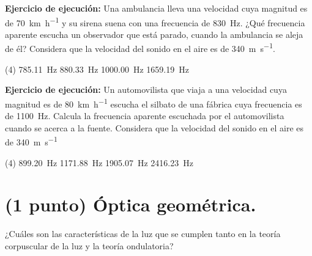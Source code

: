 \documentclass[12pt, letter]{exam}
\begin{document}
\begin{questions}
   \question \label{Ejercicio_04} \textbf{Ejercicio de ejecución: } Una ambulancia lleva una velocidad cuya magnitud es de \SI{70}{\kilo\meter\per\hour} y su sirena suena con una frecuencia de \SI{830}{\hertz}. ¿Qué frecuencia aparente escucha un observador que está parado, cuando la ambulancia se aleja de él? Considera que la velocidad del sonido en el aire es de \SI{340}{\meter\per\second}.
   \begin{tasks}(4)
    \task \SI{785.11}{\hertz}
    \task \SI{880.33}{\hertz}
    \task \SI{1000.00}{\hertz}
    \task \SI{1659.19}{\hertz}
    \end{tasks}
    \question \label{Ejercicio_05} \textbf{Ejercicio de ejecución: } Un automovilista que viaja a una velocidad cuya magnitud es de \SI{80}{\kilo\meter\per\hour} escucha el silbato de una fábrica cuya frecuencia es de \SI{1100}{\hertz}. Calcula la frecuencia aparente escuchada por el automovilista cuando se acerca a la fuente. Considera que la velocidad del sonido en el aire es de \SI{340}{\meter\per\second}
    \begin{tasks}(4)
        \task \SI{899.20}{\hertz}
        \task \SI{1171.88}{\hertz}
        \task \SI{1905.07}{\hertz}
        \task \SI{2416.23}{\hertz}
    \end{tasks}

    \section{(1 punto) Óptica geométrica.}

    \question ¿Cuáles son las características de la luz que se cumplen tanto en la teoría corpuscular de la luz y la teoría ondulatoria?
    {\renewcommand{\thepartno}{\Alph{partno}}
    }


\end{questions}
\end{document}
